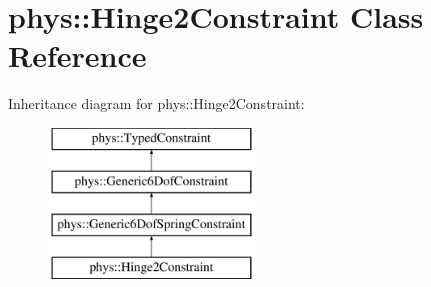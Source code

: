 \hypertarget{classphys_1_1Hinge2Constraint}{
\section{phys::Hinge2Constraint Class Reference}
\label{d2/d16/classphys_1_1Hinge2Constraint}
}
Inheritance diagram for phys::Hinge2Constraint:\begin{figure}[H]
\begin{center}
\leavevmode
\includegraphics[height=4.000000cm]{d2/d16/classphys_1_1Hinge2Constraint}
\end{center}
\end{figure}
